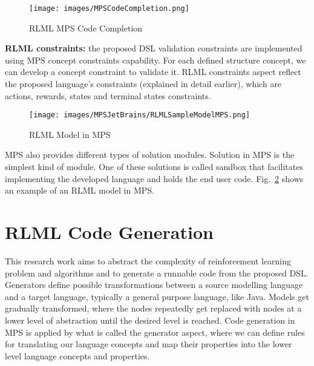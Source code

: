 \documentclass[11pt,letterpaper]{ryersonSGSThesis}
\begin{document}
\begin{ryersonSGSThesis}
        \begin{figure}[!tbh]
            \centering
            \texttt{[image: images/MPSCodeCompletion.png]}
            \caption{RLML MPS Code Completion}
            \label{fig:MPSCodeCompletion}
        \end{figure}
        
        \textbf{RLML constraints:} the proposed DSL validation constraints are implemented using MPS concept constraints capability. For each defined structure concept, we can develop a concept constraint to validate it. RLML constraints aspect reflect the proposed language's constraints (explained in detail earlier), which are actions, rewards, states and terminal states constraints.
        
        \begin{figure}[!tbh]
            \centering
            \texttt{[image: images/MPSJetBrains/RLMLSampleModelMPS.png]}
            \caption{RLML Model in MPS}
            \label{fig:RLMLModelMPS}
        \end{figure}
        
        MPS also provides different types of solution modules. Solution in MPS is the simplest kind of module. One of these solutions is called sandbox that facilitates implementing the developed language and holds the end user code. Fig.~\ref{fig:RLMLModelMPS} shows an example of an RLML model in MPS.
        
    \section{RLML Code Generation}
        This research work aims to abstract the complexity of reinforcement learning problem and algorithms and to generate a runnable code from the proposed DSL. Generators define possible transformations between a source modelling language and a target language, typically a general purpose language, like Java. Models get gradually transformed, where the nodes repeatedly get replaced with nodes at a lower level of abstraction until the desired level is reached. Code generation in MPS is applied by what is called the generator aspect, where we can define rules for translating our language concepts and map their properties into the lower level language concepts and properties.
        

\end{ryersonSGSThesis}
\end{document}
